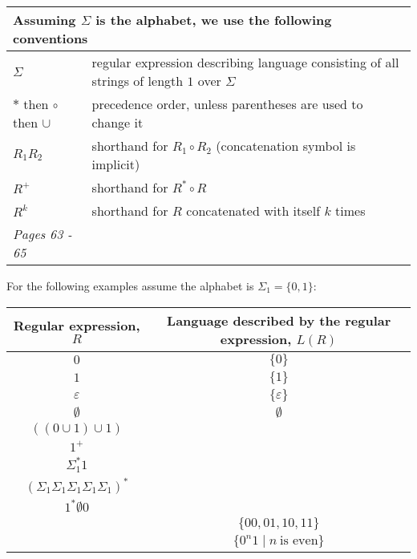 \documentclass[12pt, oneside]{article}
\begin{document}
    
    \begin{center}
    \begin{tabular}{|ll|}
    \hline
    \multicolumn{2}{|l|}{Assuming $\Sigma$ is the alphabet, we use the following conventions}\\
    \hline
    $\Sigma$   & regular  expression describing language consisting of  all strings  of length  $1$ over $\Sigma$\\
    $*$ then $\circ$ then $\cup$   & precedence order, unless parentheses are used to change it\\
    $R_1R_2$ & shorthand  for  $R_1  \circ R_2$ (concatenation symbol is implicit) \\
    $R^+$ & shorthand for $R^* \circ R$ \\
    $R^k$ & shorthand for $R$ concatenated with itself $k$ times\\
    \hline
    {\it Pages 63 - 65 }& \\
    \hline
    \end{tabular}
    \end{center}
    
    
    For the following examples assume the alphabet is $\Sigma_1 =  \{0,1\}$:
    
    \begin{center}
    \renewcommand{\arraystretch}{1.5}
    \begin{tabular}{c|c}
    Regular expression, $R$ & Language described by the regular expression, $L(R)$\\
    \hline
    $0$ &$ \{ 0 \}$ \\
    $1$ & $\{ 1 \}$ \\
    $\varepsilon$ & $\{ \varepsilon  \}$ \\
    $\emptyset$ & $\emptyset$ \\
    $((0 \cup 1) \cup 1)$ & \\
    $1^+$ & \\
    $\Sigma_1^* 1$ & \\
    $(\Sigma_1 \Sigma_1 \Sigma_1 \Sigma_1 \Sigma_1)^*$ & \\
    $1^* \emptyset 0$ & \\
    & $\{00, 01, 10, 11\}$  \\
    & $\{ 0^n1 \mid n~\text{is even} \}$
    \end{tabular}
    \end{center} \vfill
\end{document}

